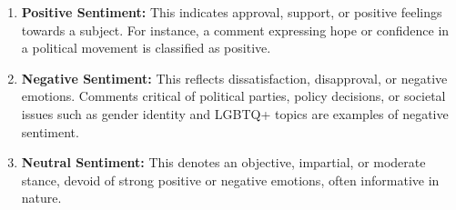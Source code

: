 \documentclass[
  man,floatsintext]{apa6}
\begin{document}
\begin{enumerate}
    \item \textbf{Positive Sentiment:} This indicates approval, support, or positive feelings towards a subject. For instance, a comment expressing hope or confidence in a political movement is classified as positive.
    \item \textbf{Negative Sentiment:} This reflects dissatisfaction, disapproval, or negative emotions. Comments critical of political parties, policy decisions, or societal issues such as gender identity and LGBTQ+ topics are examples of negative sentiment.
    \item \textbf{Neutral Sentiment:} This denotes an objective, impartial, or moderate stance, devoid of strong positive or negative emotions, often informative in nature.
\end{enumerate}
\end{document}
